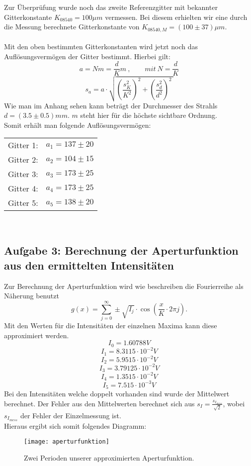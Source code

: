 Zur Überprüfung wurde noch das zweite Referenzgitter mit bekannter Gitterkonstante $K_{08540}=100 \mu m$ vermessen. Bei diesem erhielten wir eine durch die Messung berechnete Gitterkonstante von
$K_{08540,M}=(100 \pm 37) \mu m.$\\ ~\\
Mit den oben bestimmten Gitterkonstanten wird jetzt noch das Auflösungsvermögen der Gitter bestimmt. Hierbei gilt:
\[ a=Nm=\frac{d}{K}m ~,~~~~~~~~~ mit ~ N=\frac{d}{K} \]
\[ s_a=a \cdot \sqrt{ \left( \frac{s_K^2}{K^2} \right)^2 + \left( \frac{s_d^2}{d^2} \right)^2 ~ } \]
Wie man im Anhang sehen kann beträgt der Durchmesser des Strahls $d=(3.5 \pm 0.5)mm$. $m$ steht hier für die höchste sichtbare Ordnung.\\
Somit erhält man folgende Auflösungsvermögen:\\
\begin{center}
\begin{tabular}{ll}
Gitter 1: & $a_1=137 \pm 20$\\
Gitter 2: & $a_2=104 \pm 15$\\
Gitter 3: & $a_3=173 \pm 25$\\
Gitter 4: & $a_4=173 \pm 25$\\
Gitter 5: & $a_5=138 \pm 20$\\
\end{tabular}
\end{center} ~\\
\subsection{Aufgabe 3: Berechnung der Aperturfunktion aus den ermittelten Intensitäten}
Zur Berechnung der Aperturfunktion wird wie beschreiben die Fourierreihe als Näherung benutzt
\[ g(x)=\sum\limits_{j=0}^{\infty}\pm\sqrt{I_{j}}\cdot\cos\left(\frac{x}{K}\cdot 2\pi j\right). \]
Mit den Werten für die Intensitäten der einzelnen Maxima kann diese approximiert werden.
\[ I_0=1.60788 V \]
\[ I_1=8.3115 \cdot 10^{-2} V \]
\[ I_2=5.9515 \cdot 10^{-2} V \]
\[ I_3=3.79125 \cdot 10^{-2} V \]
\[ I_4=1.3515 \cdot 10^{-2} V \]
\[ I_5=7.515 \cdot 10^{-3} V \]
Bei den Intensitäten welche doppelt vorhanden sind wurde der Mittelwert berechnet. Der Fehler aus den Mittelwerten berechnet sich aus $s_I=\frac{s_{I_{mess}}}{\sqrt{2}}$, wobei $s_{I_{mess}}$ der Fehler der Einzelmessung ist.\\
Hieraus ergibt sich somit folgendes Diagramm:
\begin{figure}[h]
\begin{center}
\texttt{[image: aperturfunktion]}
\caption{Zwei Perioden unserer approximierten Aperturfunktion.}
\label{fig:aperturfunktion}
\end{center}
\end{figure}
\clearpage

